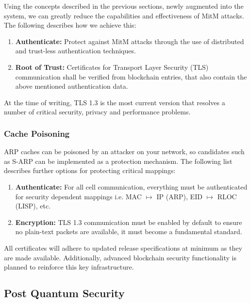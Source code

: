 \documentclass[11pt]{article}
\begin{document}
\begin{center}
     
\end{center}

\noindent Using the concepts described in the previous sections, newly augmented into the system, we can greatly reduce the capabilities and effectiveness of MitM attacks.
The following describes how we achieve this:

\begin{enumerate}
    \item \textbf{Authenticate:} Protect against MitM attacks through the use of distributed and trust-less authentication techniques.
    \item \textbf{Root of Trust:} Certificates for Transport Layer Security (TLS) communication shall be verified from blockchain entries, that also contain the above mentioned authentication data.
\end{enumerate}

\noindent At the time of writing, TLS 1.3 \cite{TLS1.3} is the most current version that resolves a number of critical security, privacy and performance problems. 

\subsubsection{Cache Poisoning}

ARP caches can be poisoned by an attacker on your network, so candidates such as S-ARP can be implemented as a protection mechanism.
The following list describes further options for protecting critical mappings:

\begin{enumerate}
    \item \textbf{Authenticate:} For all cell communication, everything must be authenticated for security dependent mappings i.e. MAC $\longmapsto$ IP (ARP), EID $\longmapsto$ RLOC (LISP), etc.
    \item \textbf{Encryption:} TLS 1.3 communication must be enabled by default to ensure no plain-text packets are available, it must become a fundamental standard.
\end{enumerate}

\noindent All certificates will adhere to updated release specifications at minimum as they are made available. 
Additionally, advanced blockchain security functionality is planned to reinforce this key infrastructure.

\subsection{Post Quantum Security}
\end{document}
